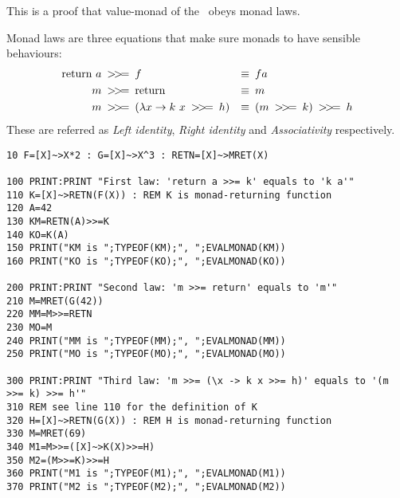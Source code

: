This is a proof that value-monad of the \tbas\ obeys monad laws.

Monad laws are three equations that make sure monads to have sensible behaviours:
\begin{align*}
\text{return}\ a \text{\enskip\basicmbind\enskip}& f &\equiv&\enskip f a\\
m \text{\enskip\basicmbind\enskip}& \text{return} &\equiv&\enskip m\\
m \text{\enskip\basicmbind\enskip}& (\lambda x \rightarrow k\ x \text{\enskip\basicmbind\enskip} h) &\equiv&\enskip (m \text{\enskip\basicmbind\enskip} k) \text{\enskip\basicmbind\enskip} h
\end{align*}
These are referred as \emph{Left identity}, \emph{Right identity} and \emph{Associativity} respectively.

\begin{lstlisting}
10 F=[X]~>X*2 : G=[X]~>X^3 : RETN=[X]~>MRET(X)

100 PRINT:PRINT "First law: 'return a >>= k' equals to 'k a'"
110 K=[X]~>RETN(F(X)) : REM K is monad-returning function
120 A=42
130 KM=RETN(A)>>=K
140 KO=K(A)
150 PRINT("KM is ";TYPEOF(KM);", ";EVALMONAD(KM))
160 PRINT("KO is ";TYPEOF(KO);", ";EVALMONAD(KO))

200 PRINT:PRINT "Second law: 'm >>= return' equals to 'm'"
210 M=MRET(G(42))
220 MM=M>>=RETN
230 MO=M
240 PRINT("MM is ";TYPEOF(MM);", ";EVALMONAD(MM))
250 PRINT("MO is ";TYPEOF(MO);", ";EVALMONAD(MO))

300 PRINT:PRINT "Third law: 'm >>= (\x -> k x >>= h)' equals to '(m >>= k) >>= h'"
310 REM see line 110 for the definition of K
320 H=[X]~>RETN(G(X)) : REM H is monad-returning function
330 M=MRET(69)
340 M1=M>>=([X]~>K(X)>>=H)
350 M2=(M>>=K)>>=H
360 PRINT("M1 is ";TYPEOF(M1);", ";EVALMONAD(M1))
370 PRINT("M2 is ";TYPEOF(M2);", ";EVALMONAD(M2))
\end{lstlisting}
